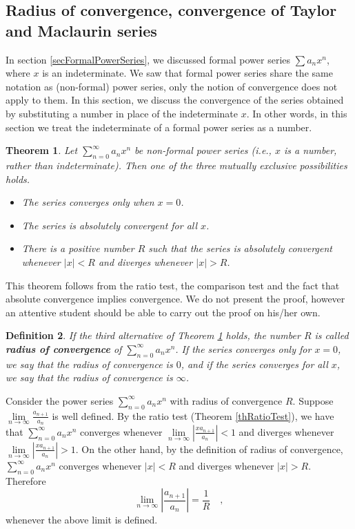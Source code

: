 \documentclass[12pt]{book}
\newtheorem{theorem}{Theorem}[section]
\newtheorem{definition}[theorem]{Definition}
\renewcommand{\emph}{\textbf}
\begin{document}
\subsection{Radius of convergence, convergence of Taylor and Maclaurin series}\label{secTaylorSeriesRadiusConvergence}
In section \ref{secFormalPowerSeries}, we discussed formal power series $\sum a_n x^n$, where $x$ is an indeterminate. We saw that formal power series share the same notation as (non-formal) power series, only the notion of convergence does not apply to them. In this section, we discuss the convergence of the series obtained by substituting a number in place of the indeterminate $x$. In other words, in this section we treat the indeterminate of a formal power series as a number.

\begin{theorem}\label{thRadiusConvergence} Let $\sum\limits_{n=0}^\infty a_n x^n$ be non-formal power series (i.e., $x$ is a number, rather than indeterminate). Then one of the three mutually exclusive possibilities holds.
\begin{itemize}
\item The series converges only when $x=0$.
\item The series is absolutely convergent for all $x$.
\item There is a positive number $R$ such that the series is absolutely convergent whenever $|x|<R$ and diverges whenever $|x|>R$.
\end{itemize}
\end{theorem}
This theorem follows from the ratio test, the comparison test and the fact that absolute convergence implies convergence. We do not present the proof, however an attentive student should be able to carry out the proof on his/her own.

\begin{definition}\label{defRadiusConvergence} 
If the third alternative of Theorem \ref{thRadiusConvergence} holds, the number $R$ is called \emph{radius of convergence} of $\sum\limits_{n=0}^\infty a_n x^n$. If the series converges only for $x=0$, we say that the radius of convergence is $0$, and if the series converges for all $x$, we say that the radius of convergence is $\infty$.
\end{definition}

Consider the power series $\sum\limits_{n=0}^\infty a_n x^n$ with radius of convergence $R$.  Suppose $\lim\limits_{n\to\infty} \frac{a_{n+1}}{a_n}$ is well defined. By the ratio test (Theorem \ref{thRatioTest}), we have that  $\sum\limits_{n=0}^\infty a_n x^n$ converges whenever $\lim\limits_{n\to\infty} \left|\frac{xa_{n+1}}{a_n}\right|<1$ and diverges whenever $\lim\limits_{n\to\infty} \left|\frac{xa_{n+1}}{a_n}\right|>1$. On the other hand, by the definition of radius of convergence, $\sum\limits_{n=0}^\infty a_n x^n$ converges whenever $|x|<R$ and diverges whenever $|x|>R$. Therefore
\[
\lim\limits_{n\to\infty} \left|\frac{a_{n+1}}{a_n}\right|=\frac{1}{R}\quad,
\]
whenever the above limit is defined.
\end{document}
